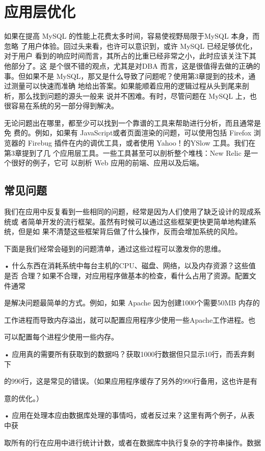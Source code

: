 \chapter{应用层优化}
如果在提高 MySQL 的性能上花费太多时间，容易使视野局限于MySQL 本身，而忽略
了用户体验。回过头来看，也许可以意识到，或许 MySQL 已经足够优化，对于用户
看到的响应时间而言，其所占的比重已经非常之小，此时应该关注下其他部分了。这
是个很不错的观点，尤其是对DBA 而言，这是很值得去做的正确的事。但如果不是
MySQL，那又是什么导致了问题呢？使用第3章提到的技术，通过测量可以快速而准确
地给出答案。如果能顺着应用的逻辑过程从头到尾来剖析，那么找到问题的源头一般来
说并不困难。有时，尽管问题在 MySQL 上，也很容易在系统的另一部分得到解决。

无论问题出在哪里，都至少可以找到一个靠谱的工具来帮助进行分析，而且通常是免
费的。例如，如果有 JavaScript或者页面渲染的问题，可以使用包括 Firefox 浏览器的
Firebug 插件在内的调优工具，或者使用 Yahoo！的YSlow 工具。我们在第3章提到了几
个应用层工具。一些工具甚至可以剖析整个堆栈：New Relic 是一个很好的例子，它可
以剖析 Web 应用的前端、应用以及后端。

\section{常见问题}
我们在应用中反复看到一些相同的问题，经常是因为人们使用了缺乏设计的现成系统或
者简单开发的流行框架。虽然有时候可以通过这些框架更快更简单地构建系统，但是如
果不清楚这些框架背后做了什么操作，反而会增加系统的风险。

下面是我们经常会碰到的问题清单，通过这些过程可以激发你的思维。

• 什么东西在消耗系统中每台主机的CPU、磁盘、网络，以及内存资源？这些值是否
合理？如果不合理，对应用程序做基本的检查，看什么占用了资源。配置文件通常

是解决问题最简单的方式。例如，如果 Apache 因为创建1000个需要50MB 内存的

工作进程而导致内存溢出，就可以配置应用程序少使用一些Apache工作进程。也

可以配置每个进程少使用一些内存。

• 应用真的需要所有获取到的数据吗？获取1000行数据但只显示10行，而丢弃剩下

的990行，这是常见的错误。（如果应用程序缓存了另外的990行备用，这也许是有

意的优化。）

• 应用在处理本应由数据库处理的事情吗，或者反过来？这里有两个例子，从表中获

取所有的行在应用中进行统计计数，或者在数据库中执行复杂的字符串操作。数据

